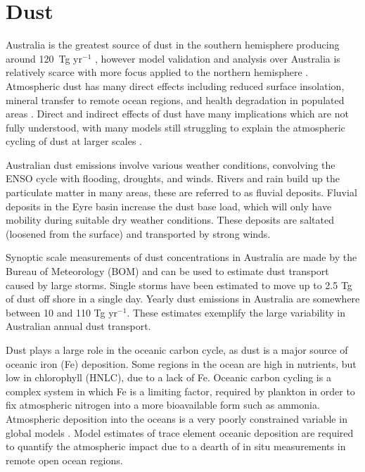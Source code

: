 
\section{Dust}
\label{ch_LitRev:sec:dust}

  Australia is the greatest source of dust in the southern hemisphere producing around 120~Tg yr$^{-1}$ \citep{Li2008}, however model validation and analysis over Australia is relatively scarce with more focus applied to the northern hemisphere \citep{Fairlie2007, Ridley2013}.
  Atmospheric dust has many direct effects including reduced surface insolation, mineral transfer to remote ocean regions, and health degradation in populated areas \citep{Shao2007}.
  Direct and indirect effects of dust have many implications which are not fully understood, with many models still struggling to explain the atmospheric cycling of dust at larger scales \citep{Rotstayn2011}.

  Australian dust emissions involve various weather conditions, convolving the ENSO cycle with flooding, droughts, and winds.
  Rivers and rain build up the particulate matter in many areas, these are referred to as fluvial deposits.
  Fluvial deposits in the Eyre basin increase the dust base load, which will only have mobility during suitable dry weather conditions.
  These deposits are saltated (loosened from the surface) and transported by strong winds\citep{Zender2003}.

  Synoptic scale measurements of dust concentrations in Australia are made by the Bureau of Meteorology (BOM) and can be used to estimate dust transport caused by large storms. 
  Single storms have been estimated to move up to 2.5 Tg of dust off shore in a single day.
  Yearly dust emissions in Australia are somewhere between 10 and 110 Tg yr$^{-1}$.
  These estimates exemplify the large variability in Australian annual dust transport.

  Dust plays a large role in the oceanic carbon cycle, as dust is a major source of oceanic iron (Fe) deposition.
  Some regions in the ocean are high in nutrients, but low in chlorophyll (HNLC), due to a lack of Fe.
  Oceanic carbon cycling is a complex system in which Fe is a limiting factor, required by plankton in order to fix atmospheric nitrogen into a more bioavailable form such as ammonia.
  Atmospheric deposition into the oceans is a very poorly constrained variable in global models \citep{Grand2015}.
  Model estimates of trace element oceanic deposition are required to quantify the atmospheric impact due to a dearth of in situ measurements in remote open ocean regions.

